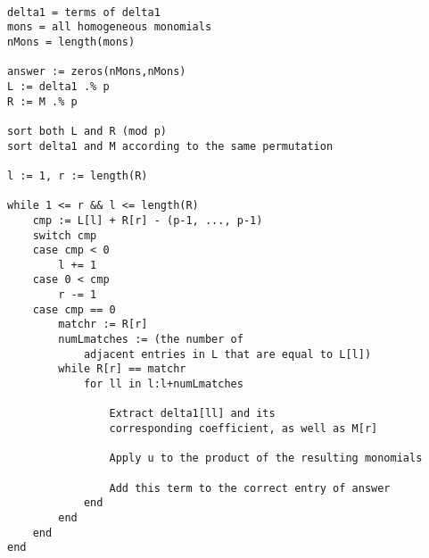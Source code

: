 \begin{alg}

\begin{lstlisting}

delta1 = terms of delta1
mons = all homogeneous monomials
nMons = length(mons)

answer := zeros(nMons,nMons)
L := delta1 .% p
R := M .% p

sort both L and R (mod p)
sort delta1 and M according to the same permutation

l := 1, r := length(R)

while 1 <= r && l <= length(R)
    cmp := L[l] + R[r] - (p-1, ..., p-1)
    switch cmp
    case cmp < 0
        l += 1
    case 0 < cmp
        r -= 1
    case cmp == 0
        matchr := R[r]
        numLmatches := (the number of 
            adjacent entries in L that are equal to L[l])
        while R[r] == matchr
            for ll in l:l+numLmatches

                Extract delta1[ll] and its 
                corresponding coefficient, as well as M[r]

                Apply u to the product of the resulting monomials

                Add this term to the correct entry of answer
            end
        end
    end	
end		

\end{lstlisting}


%	
%	
%
%
%
%
%
%
%
%
%
%
%
%
%
%
%
%
%
%
%
%
%
%	
%
%
\end{alg}

